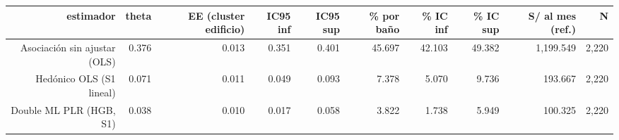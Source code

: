 \begin{tabular}{rrrrrrrrrr}
\toprule
estimador & theta & EE (cluster edificio) & IC95 inf & IC95 sup & \% por baño & \% IC inf & \% IC sup & S/ al mes (ref.) & N \\
\midrule
Asociación sin ajustar (OLS) & 0.376 & 0.013 & 0.351 & 0.401 & 45.697 & 42.103 & 49.382 & 1,199.549 & 2,220 \\
Hedónico OLS (S1 lineal) & 0.071 & 0.011 & 0.049 & 0.093 & 7.378 & 5.070 & 9.736 & 193.667 & 2,220 \\
Double ML PLR (HGB, S1) & 0.038 & 0.010 & 0.017 & 0.058 & 3.822 & 1.738 & 5.949 & 100.325 & 2,220 \\
\bottomrule
\end{tabular}